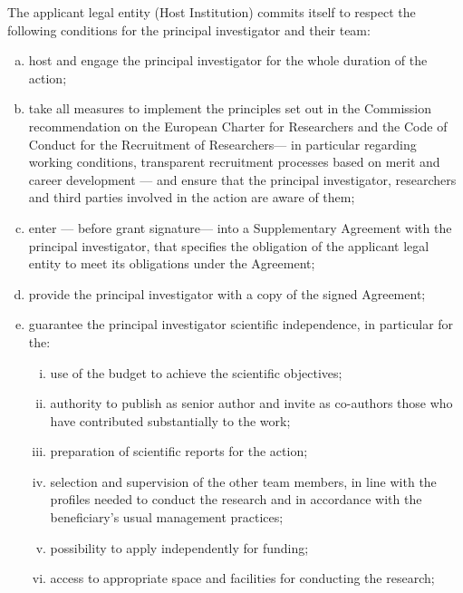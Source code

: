 \documentclass[12pt]{scrartcl}
\begin{document}
The applicant legal entity (Host Institution) commits itself to respect the
following conditions for the principal investigator and their team:
\begin{enumerate}[a), itemsep=-2pt]
    \item host and engage the principal investigator for the whole duration of
    the action;

    \item take all measures to implement the principles set out in the Commission
    recommendation on the European Charter for Researchers and the Code of
    Conduct for the Recruitment of Researchers\footnotemark --- in particular
    regarding working conditions, transparent recruitment processes based on
    merit and career development --- and ensure that the principal investigator,
    researchers and third parties involved in the action are aware of them;


    \item enter — before grant signature— into a Supplementary Agreement with
    the principal investigator, that specifies the obligation of the applicant
    legal entity to meet its obligations under the Agreement;

    \item provide the principal investigator with a copy of the signed Agreement;

    \item guarantee the principal investigator scientific independence, in
    particular for the:

    \begin{enumerate}[i),itemsep=-5pt,partopsep=-5pt]
        \item use of the budget to achieve the scientific objectives;
        \item authority to publish as senior author and invite as co-authors
        those who have contributed substantially to the work;
        \item preparation of scientific reports for the action;
        \item selection and supervision of the other team members, in line with
        the profiles needed to conduct the research and in accordance with the
        beneficiary's usual management practices;
        \item possibility to apply independently for funding;
        \item access to appropriate space and facilities for conducting the research;
    \end{enumerate}


\end{enumerate}
\end{document}
